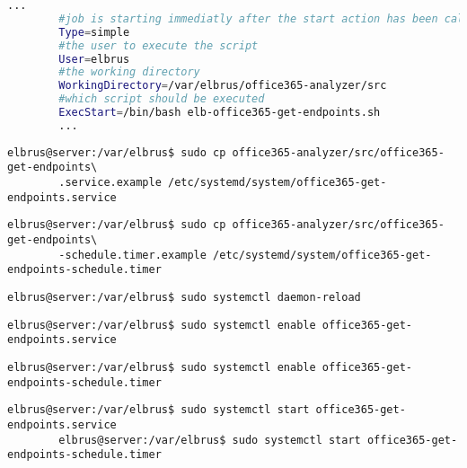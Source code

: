 	\lstset{style=files}
	\begin{lstlisting}[caption={uptime\_monitor.service.example - Die Variable 'WorkingDirectory' sowie die Variable 'User' anpassen.},language=bash ,keywords={WorkingDirectory, User}, keywordstyle=\color{red}, firstnumber=4]
		...
		#job is starting immediatly after the start action has been called
		Type=simple
		#the user to execute the script
		User=elbrus
		#the working directory
		WorkingDirectory=/var/elbrus/office365-analyzer/src
		#which script should be executed
		ExecStart=/bin/bash elb-office365-get-endpoints.sh
		...
	\end{lstlisting}
	
	\lstset{style=commands}
	\begin{lstlisting}[caption={Kopieren des Serviceprogrammes.}]
		elbrus@server:/var/elbrus$ sudo cp office365-analyzer/src/office365-get-endpoints\
		.service.example /etc/systemd/system/office365-get-endpoints.service
	\end{lstlisting}
	
	\lstset{style=commands}
	\begin{lstlisting}[caption={Kopieren des Zeitplanungsprogrammes.}]
		elbrus@server:/var/elbrus$ sudo cp office365-analyzer/src/office365-get-endpoints\
		-schedule.timer.example /etc/systemd/system/office365-get-endpoints-schedule.timer
	\end{lstlisting}
	
	\lstset{style=commands}
	\begin{lstlisting}[caption={Neuladen des 'systemctl' Deamons.}]
		elbrus@server:/var/elbrus$ sudo systemctl daemon-reload
	\end{lstlisting}
	
	\lstset{style=commands}
	\begin{lstlisting}[caption={Aktivieren des Serviceprogrammes.}]
		elbrus@server:/var/elbrus$ sudo systemctl enable office365-get-endpoints.service
	\end{lstlisting}
	
	\lstset{style=commands}
	\begin{lstlisting}[caption={Aktivieren des Zeitplanungsprogrammes.}]
		elbrus@server:/var/elbrus$ sudo systemctl enable office365-get-endpoints-schedule.timer
	\end{lstlisting}
	
	\lstset{style=commands}
	\begin{lstlisting}[caption={Starten des Serviceprogrammes \& Zeitplanungsprogrammes.}]
		elbrus@server:/var/elbrus$ sudo systemctl start office365-get-endpoints.service
		elbrus@server:/var/elbrus$ sudo systemctl start office365-get-endpoints-schedule.timer
	\end{lstlisting}
